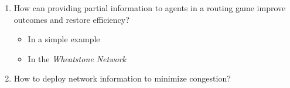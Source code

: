 \documentclass[../review.tex]{subfiles}
\begin{document}
\begin{enumerate}
  \item How can providing partial information to agents in a routing game improve outcomes and restore efficiency?
  \begin{itemize}
    \item In a simple example
    \item In the \textit{Wheatstone Network}
  \end{itemize}
  \item How to deploy network information to minimize congestion?
\end{enumerate}
\end{document}
